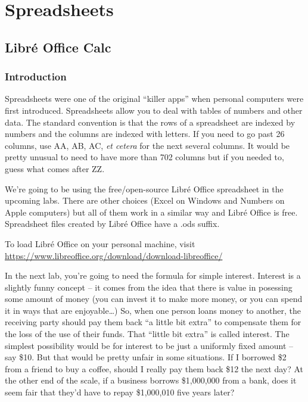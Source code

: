  
\chapter{Spreadsheets}


\section{Libr\'{e} Office Calc}
\label{sec:calc}

\subsection{Introduction}


Spreadsheets were one of the original ``killer apps'' when personal computers were first introduced.  Spreadsheets allow you to deal with tables of numbers and other data.  The standard convention is that the rows of a spreadsheet are indexed by numbers and the columns are indexed with letters.  If you need to go past 26 columns, use AA, AB, AC, {\em et cetera} for the next several columns.  It would be pretty unusual to need to have more than 702 columns but if you needed to, guess what comes after ZZ.

We're going to be using the free/open-source Libr\'{e} Office spreadsheet in the upcoming labs.  There are other choices (Excel on Windows and Numbers on Apple computers) but all of them work in a similar way and Libr\'{e} Office is free.  Spreadsheet files created by 
Libr\'{e} Office have a .ods suffix.  

To load Libr\'{e} Office on your personal machine, visit \url{https://www.libreoffice.org/download/download-libreoffice/}

In the next lab, you're going to need the formula for simple interest.  Interest is a slightly funny concept -- it comes from the idea that there is value in posessing some amount of money (you can invest it to make more money, or you can spend it in ways that are enjoyable\dots)  So, when one person loans money to another, the receiving party should pay them back ``a little bit extra'' to compensate them for the loss of the use of their funds.  That ``little bit extra'' is called interest.  The simplest possibility would be for interest to be just a uniformly fixed amount -- say \$10.  But that would be pretty unfair in some situations.  If I borrowed \$2 from a friend to buy a coffee, should I really pay them back \$12 the next day?  At the other end of the scale, if a business borrows \$1,000,000 from a bank, does it seem fair that they'd have to repay
\$1,000,010 five years later?

